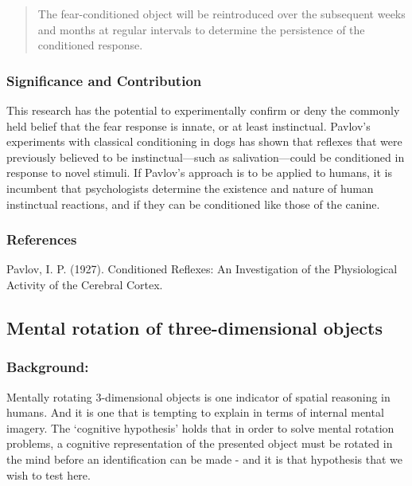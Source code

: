 \begin{refsection}
\begin{quote}
The fear-conditioned object will be reintroduced over the subsequent weeks and months at regular intervals to determine the persistence of the conditioned response. 
\end{quote}

\subsubsection{Significance and Contribution}
\label{significanceandcontribution}

This research has the potential to experimentally confirm or deny the commonly held belief that the fear response is innate, or at least instinctual. Pavlov's experiments with classical conditioning in dogs has shown that reflexes that were previously believed to be instinctual—such as salivation—could be conditioned in response to novel stimuli. If Pavlov's approach is to be applied to humans, it is incumbent that psychologists determine the existence and nature of human instinctual reactions, and if they can be conditioned like those of the canine.

\subsubsection{References}
\label{references}

Pavlov, I. P. (1927). Conditioned Reflexes: An Investigation of the Physiological Activity of the Cerebral Cortex. 

\newpage

\subsection{Mental rotation of three-dimensional objects}
\label{mentalrotationofthree-dimensionalobjects}

\subsubsection{Background:}
\label{background:}

Mentally rotating 3-dimensional objects is one indicator of spatial reasoning in humans. And it is one that is tempting to explain in terms of internal mental imagery. The `cognitive hypothesis' holds that in order to solve mental rotation problems, a cognitive representation of the presented object must be rotated in the mind before an identification can be made - and it is that hypothesis that we wish to test here.


\end{refsection}
